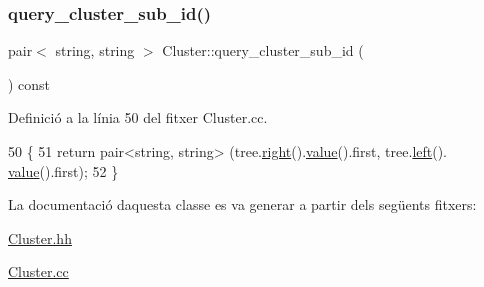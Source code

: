 \subsubsection{\texorpdfstring{query\+\_\+cluster\+\_\+sub\+\_\+id()}{query\_cluster\_sub\_id()}}
{\footnotesize\ttfamily pair$<$ string, string $>$ Cluster\+::query\+\_\+cluster\+\_\+sub\+\_\+id (\begin{DoxyParamCaption}{ }\end{DoxyParamCaption}) const}



Definició a la línia 50 del fitxer Cluster.\+cc.


\begin{DoxyCode}
50                                                          \{
51     \textcolor{keywordflow}{return} pair<string, string> (tree.\hyperlink{class_bin_tree_aff8e96651b27284c329667b5ad3e4d0b}{right}().\hyperlink{class_bin_tree_a734e785b089c87b49187ee7c58edf5f3}{value}().first, tree.\hyperlink{class_bin_tree_a82108db4c1b08d1f111027788c196d4e}{left}().
      \hyperlink{class_bin_tree_a734e785b089c87b49187ee7c58edf5f3}{value}().first);
52 \}
\end{DoxyCode}


La documentació d\textquotesingle{}aquesta classe es va generar a partir dels següents fitxers\+:\begin{DoxyCompactItemize}
\item 
\hyperlink{_cluster_8hh}{Cluster.\+hh}\item 
\hyperlink{_cluster_8cc}{Cluster.\+cc}\end{DoxyCompactItemize}
